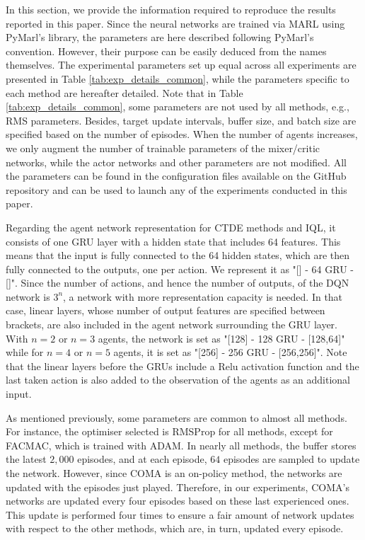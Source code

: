 In this section, we provide the information required to reproduce the results reported in this paper.
Since the neural networks are trained via MARL using PyMarl's \citep{samvelyan2019starcraft} library, the parameters are here described following PyMarl's convention.
However, their purpose can be easily deduced from the names themselves.
The experimental parameters set up equal across all experiments are presented in Table \ref{tab:exp_details_common}, while the parameters specific to each method are hereafter detailed.
Note that in Table \ref{tab:exp_details_common}, some parameters are not used by all methods, e.g., RMS parameters. Besides, target update intervals, buffer size, and batch size are specified based on the number of episodes.
When the number of agents increases, we only augment the number of trainable parameters of the mixer/critic networks, while the actor networks and other parameters are not modified.
All the parameters can be found in the configuration files available on the GitHub repository and can be used to launch any of the experiments conducted in this paper.

Regarding the agent network representation for CTDE methods and IQL, it consists of one GRU layer with a hidden state that includes 64 features.
This means that the input is fully connected to the 64 hidden states, which are then fully connected to the outputs, one per action.
We represent it as "[] - 64 GRU - []".
Since the number of actions, and hence the number of outputs, of the DQN network is $3^n$, a network with more representation capacity is needed.
In that case, linear layers, whose number of output features are specified between brackets, are also included in the agent network surrounding the GRU layer.
With $n=2$ or $n=3$ agents, the network is set as "[128] - 128 GRU - [128,64]" while for $n=4$ or $n=5$ agents, it is set as "[256] - 256 GRU - [256,256]".
Note that the linear layers before the GRUs include a Relu activation function and the last taken action is also added to the observation of the agents as an additional input.

As mentioned previously, some parameters are common to almost all methods.
For instance, the optimiser selected is RMSProp for all methods, except for FACMAC, which is trained with ADAM.
In nearly all methods, the buffer stores the latest $2,000$ episodes, and at each episode, $64$ episodes are sampled to update the network.
However, since COMA is an on-policy method, the networks are updated with the episodes just played.
Therefore, in our experiments, COMA's networks are updated every four episodes based on these last experienced ones.
This update is performed four times to ensure a fair amount of network updates with respect to the other methods, which are, in turn, updated every episode.


